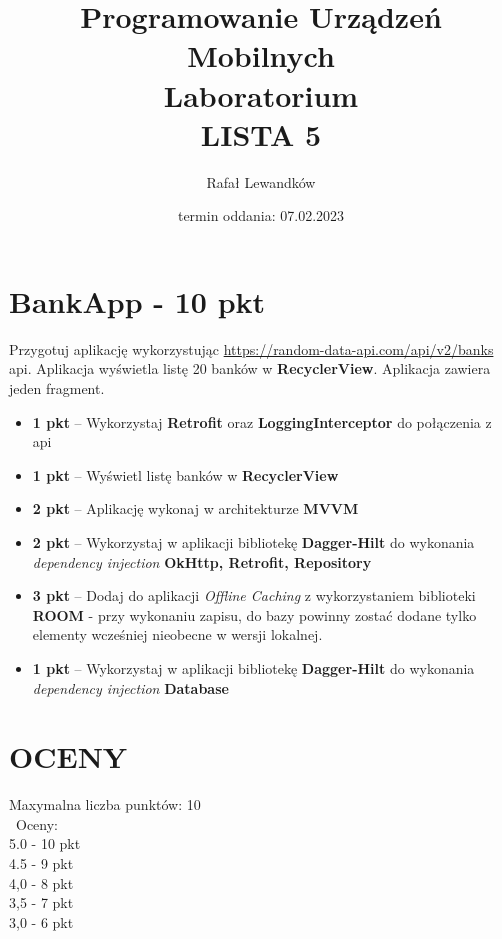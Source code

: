 \documentclass[a4paper]{article}
\title{Programowanie Urządzeń Mobilnych \\ Laboratorium \\ \textbf{LISTA 5}}
\author{Rafał Lewandków}
\date{termin oddania: 07.02.2023}
\begin{document}
\maketitle
    

\section*{BankApp - 10 pkt}

Przygotuj aplikację wykorzystując \url{https://random-data-api.com/api/v2/banks} api. Aplikacja wyświetla listę 20 banków w \textbf{RecyclerView}. Aplikacja zawiera jeden fragment.

\begin{itemize}
\item \textbf{1 pkt} -- Wykorzystaj \textbf{Retrofit} oraz \textbf{LoggingInterceptor} do połączenia z api

\item \textbf{1 pkt} -- Wyświetl listę banków w \textbf{RecyclerView}

\item \textbf{2 pkt} -- Aplikację wykonaj w architekturze \textbf{MVVM}

\item \textbf{2 pkt} -- Wykorzystaj w aplikacji bibliotekę \textbf{Dagger-Hilt} do wykonania \textit{dependency injection} \textbf{OkHttp, Retrofit, Repository}

\item \textbf{3 pkt} -- Dodaj do aplikacji \textit{Offline Caching} z wykorzystaniem biblioteki \textbf{ROOM} - przy wykonaniu zapisu, do bazy powinny zostać dodane tylko elementy wcześniej nieobecne w wersji lokalnej.

\item \textbf{1 pkt} -- Wykorzystaj w aplikacji bibliotekę \textbf{Dagger-Hilt} do wykonania \textit{dependency injection} \textbf{Database}
\end{itemize}

\section*{OCENY}
Maxymalna liczba punktów: 10\\\
Oceny:\\
5.0 - 10 pkt\\
4.5 - 9 pkt\\
4,0 - 8 pkt\\
3,5 - 7 pkt\\
3,0 - 6 pkt
\end{document}
